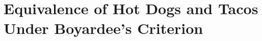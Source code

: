\chapter{Equivalence of Hot Dogs and Tacos Under Boyardee's Criterion}
\label{paper1}


\break



\break
\singlespacing
{}
\doublespacing
